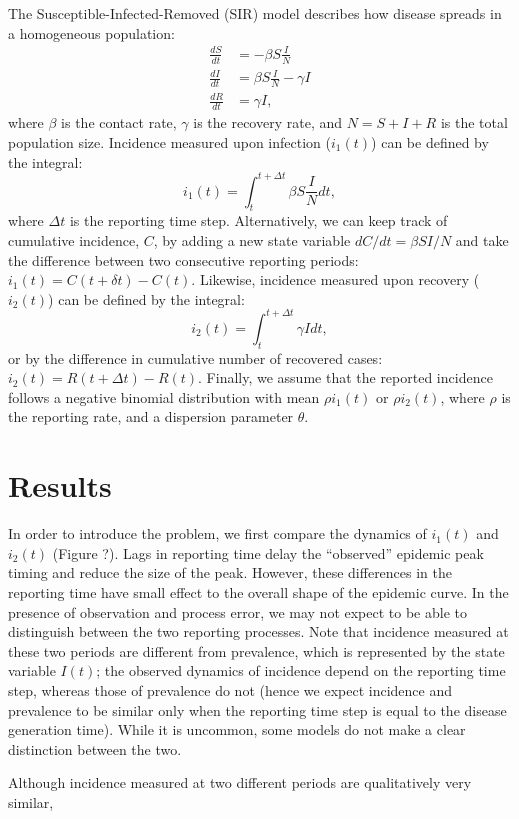 \documentclass{article}\usepackage[]{graphicx}\usepackage[]{color}
\begin{document}
The Susceptible-Infected-Removed (SIR) model describes how disease spreads in a
homogeneous population:
\begin{equation}
\begin{aligned}
\frac{dS}{dt} &= - \beta S \frac{I}{N}\\
\frac{dI}{dt} &= \beta S \frac{I}{N} - \gamma I\\
\frac{dR}{dt} &= \gamma I,
\end{aligned}
\end{equation}
where $\beta$ is the contact rate, $\gamma$ is the recovery rate, and $N = S + I + R$ is
the total population size. Incidence measured upon infection ($i_1(t)$) can be
defined by the integral:
\begin{equation}
i_1(t) = \int_{t}^{t + \Delta t} \beta S \frac{I}{N} dt,
\end{equation}
where $\Delta t$ is the reporting time step.
Alternatively, we can keep track of cumulative incidence, $C$, by adding a 
new state variable $dC/dt = \beta S I/N$ and take the difference between 
two consecutive reporting periods: $i_1(t) = C(t+\delta t) - C(t)$. Likewise, 
incidence measured upon recovery ($i_2(t)$) can be defined by the integral:
\begin{equation}
i_2(t) = \int_{t}^{t + \Delta t} \gamma I dt,
\end{equation}
or by the difference in cumulative number of recovered cases: $i_2(t) = R(t + \Delta t) - R(t)$.
Finally, we assume that the reported incidence follows a negative binomial 
distribution with mean $\rho i_1(t)$ or $\rho i_2(t)$, where $\rho$ is the 
reporting rate, and a dispersion parameter $\theta$.

\section{Results}

In order to introduce the problem, we first compare the dynamics of $i_1(t)$ and
$i_2(t)$ (Figure ?). Lags in reporting time delay the ``observed'' epidemic peak 
timing and reduce the size of the peak. However, these differences in the reporting
time have small effect to the overall shape of the epidemic curve. In the presence
of observation and process error, we may not expect to be able to distinguish between
the two reporting processes. Note that incidence measured at these two periods are 
different from prevalence, which is represented by the state variable $I(t)$; the
observed dynamics of incidence depend on the reporting time step, whereas those of
prevalence do not (hence we expect incidence and prevalence to be similar only when
the reporting time step is equal to the disease generation time). While it is
uncommon, some models do not make a clear distinction between the two.

Although incidence measured at two different periods are qualitatively very similar,








\end{document}
